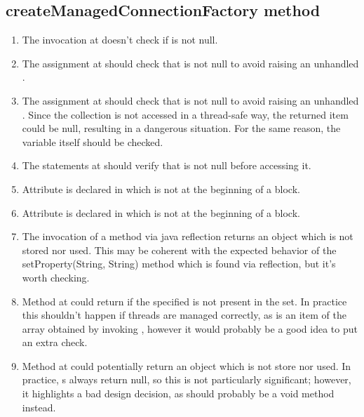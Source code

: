 \subsection{createManagedConnectionFactory method}
\begin{enumerate}
	\item {} The invocation  at  doesn't check if  is not null.
	\item {} The assignment  at  should check that  is not null to avoid raising an unhandled . 
	\item {} The assignment  at  should check that  is not null to avoid raising an unhandled . Since the collection is not accessed in a thread-safe way, the returned item could be null, resulting in a dangerous situation. For the same reason, the  variable itself should be checked. 
	\item {} The  statements at  should verify that  is not null before accessing it. 
	\item {} Attribute  is declared in  which is not at the beginning of a block. 
	\item {} Attribute  is declared in  which is not at the beginning of a block.
	\item {} The invocation of a method via java reflection returns an  object which is not stored nor used. This may be coherent with the expected behavior of the setProperty(String, String) method which is found via reflection, but it's worth checking. 
	\item {} Method  at  could return  if the specified  is not present in the  set. In practice this shouldn't happen if threads are managed correctly, as  is an item of the array obtained by invoking , however it would probably be a good idea to put an extra check. 
	\item {} Method  at  could potentially return an  object which is not store nor used. In practice, s always return null, so this is not particularly significant; however, it highlights a bad design decision, as  should probably be a void method instead. 

\end{enumerate}
